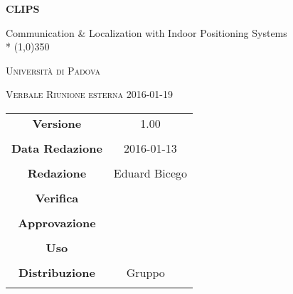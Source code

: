 \documentclass[a4paper,12pt]{article}
\author{Eduard Bicego}
\date{19/01/2016}
\begin{document}
\begin{titlepage}
	\centering
	{\huge\bfseries CLIPS\par}
	Communication \& Localization with Indoor Positioning Systems \\*
	\line(1,0){350} \\
	{\scshape\LARGE Università di Padova \par}
	\vspace{1cm}
	{\scshape\Large Verbale Riunione esterna 2016-01-19 \par}
	\logo
	\newpage
	\begin{tabular}{c|c}
		{\hfill \textbf{Versione}} 			& 1.00				\\ \\
		{\hfill\textbf{Data Redazione}} 	& 2016-01-13  		\\ \\
		{\hfill\textbf{Redazione}} 			& Eduard Bicego		\\ \\
		{\hfill\textbf{Verifica}} 			&  					\\ \\
		{\hfill\textbf{Approvazione}} 		&  					\\ \\
		{\hfill\textbf{Uso}} 				& 					\\ \\
		{\hfill\textbf{Distribuzione}} 		& Gruppo \leaf\		\\ \\
	\end{tabular}
\end{titlepage}
	
	\newpage

	
	\label{LastFrontPage}
	

	\newpage
	
	\pagestyle{mymain}
	
	
		

	
		
	
	\newpage
		
	
	\newpage
		
				
	\label{LastPage}
\end{document}
